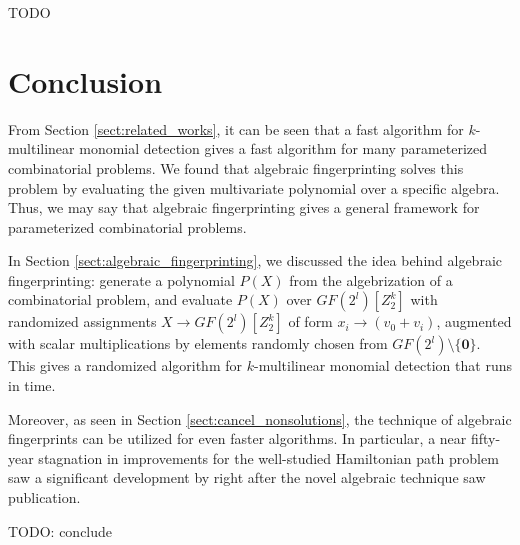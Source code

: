 TODO
\clearpage
\section{Conclusion}

From Section \ref{sect:related_works}, 
it can be seen  
that a fast algorithm for $k$-multilinear monomial detection gives a 
fast algorithm for many parameterized combinatorial problems. 
We found that algebraic fingerprinting solves this problem by 
evaluating the given multivariate polynomial over a specific algebra. 
Thus, we 
may say that algebraic fingerprinting gives a general framework for 
parameterized combinatorial problems. 

In Section \ref{sect:algebraic_fingerprinting}, we discussed the idea behind 
algebraic fingerprinting: generate a polynomial $P(X)$ from the algebrization of 
a combinatorial problem, and evaluate $P(X)$ over $GF(2^{l})[Z_2^k]$ with 
randomized assignments $X \to GF(2^{l})[Z_2^k]$ of form 
$x_i \to (v_0 + v_i)$, augmented with scalar multiplications 
by elements randomly chosen from $GF(2^{l}) \setminus \{\mathbf{0}\}$. 
This gives a  
randomized algorithm for $k$-multilinear monomial detection that runs in  time.

Moreover, as seen in Section \ref{sect:cancel_nonsolutions}, 
the technique of algebraic fingerprints can be utilized for even 
faster algorithms. In particular, a near fifty-year stagnation 
in improvements for the well-studied Hamiltonian path problem saw 
a significant development by \citeauthor{Björklund14} right after 
the novel algebraic technique \cite{Koutis08} saw publication.

TODO: conclude
